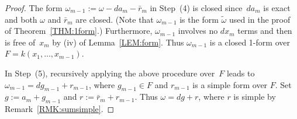 \documentclass[10pt,a4paper]{amsart}
\begin{document}
\begin{proof}

The form $\omega_{m-1}:=\omega-da_m-\bar{r}_m$ in Step~(4) is closed since~$d a_m$ is exact and both $\omega$ and $\bar{r}_m$ are closed. (Note that $\omega_{m-1}$ is the form $\widetilde \omega$ used in the proof of Theorem~\ref{THM:1form}.) Furthermore, $\omega_{m-1}$ involves no $dx_m$ terms and then is free of~$x_m$ by {\rm(iv)} of Lemma~\ref{LEM:form}.  Thus $\omega_{m-1}$ is a closed 1-form over $F = k(x_1,\dots,x_{m-1})$.

In Step~(5), recursively applying the above procedure over~$F$ leads to $\omega_{m-1}= dg_{m-1}+r_{m-1}$,
where $g_{m-1}\in F$ and $r_{m-1}$ is a simple form over $F$.
Set $g := a_m+g_{m-1}$ and $r := \bar{r}_m + r_{m-1}$. Thus $\omega = dg + r$, where $r$ is simple by Remark~\ref{RMK:sumsimple}. 
\end{proof}
\end{document}
